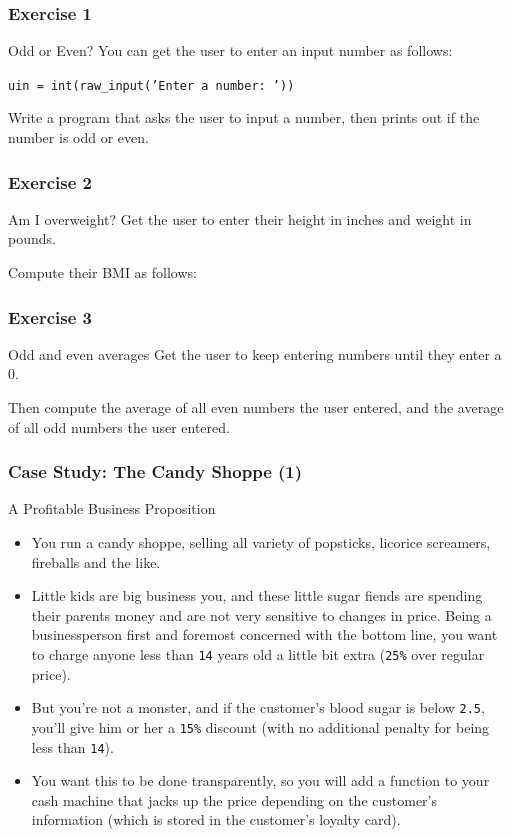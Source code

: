 \documentclass[10pt]{beamer}
\begin{document}
\begin{frame}
  \frametitle{Exercise 1}
  \begin{block}{Odd or Even?}
     You can get the user to enter an input number as follows:

     \texttt{uin = int(raw_input('Enter a number: '))}

     Write a program that asks the user to input a number, then prints out if the number is odd or even.
  \end{block}
\end{frame}
    
\begin{frame}
  \frametitle{Exercise 2}
  \begin{block}{Am I overweight?}
     Get the user to enter their height in inches and weight in pounds.

     Compute their BMI as follows: 
  \end{block}
\end{frame}
    
\begin{frame}
  \frametitle{Exercise 3}
  \begin{block}{Odd and even averages}
     Get the user to keep entering numbers until they enter a 0.

     Then compute the average of all even numbers the user entered, and the average of all odd numbers the user entered.
  \end{block}
\end{frame}
    
\begin{frame}
  \frametitle{Case Study: The Candy Shoppe (1)}
  \begin{block}{A Profitable Business Proposition}
    \begin{itemize}
      \item You run a candy shoppe, selling all variety of popsticks, licorice screamers, fireballs and the like.
      \item Little kids are big business you, and these little sugar fiends are spending their parents money and are not very sensitive to changes in price.
        Being a businessperson first and foremost concerned with the bottom line, you want to charge anyone less than \texttt{14} years old a little bit extra (\texttt{25\%} over regular price).
      \item But you're not a monster, and if the customer's blood sugar is below \texttt{2.5}, you'll give him or her a \texttt{15\%} discount (with no additional penalty for being less than \texttt{14}).
      \item You want this to be done transparently, so you will add a function to your cash machine that jacks up the price depending on the customer's information (which is stored in the customer's loyalty card).
    \end{itemize}
  \end{block}
\end{frame}
\end{document}
